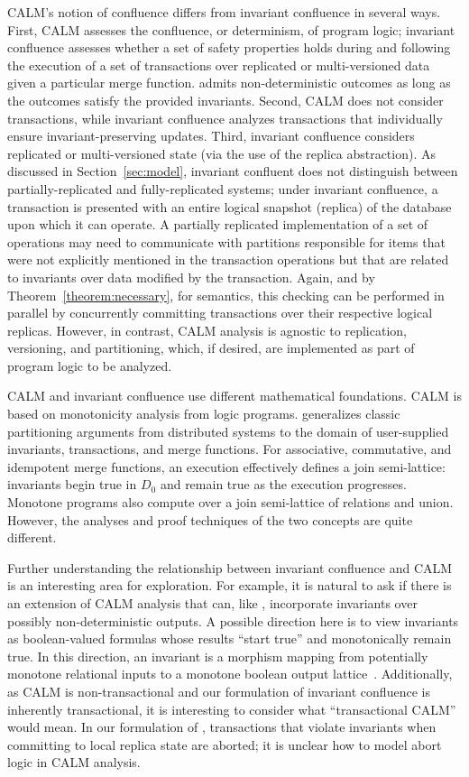 CALM's notion of confluence differs from invariant confluence in
several ways. First, CALM assesses the confluence, or determinism, of
program logic; invariant confluence assesses whether a set of safety
properties holds during and following the execution of a set of
transactions over replicated or multi-versioned data given a
particular merge function. \Iconfluence admits non-deterministic
outcomes as long as the outcomes satisfy the provided invariants.
Second, CALM does not consider transactions, while invariant
confluence analyzes transactions that individually ensure
invariant-preserving updates.  Third, invariant confluence considers
replicated or multi-versioned state (via the use of the replica
abstraction). As discussed in Section~\ref{sec:model}, invariant
confluent does not distinguish between partially-replicated and
fully-replicated systems; under invariant confluence, a transaction is
presented with an entire logical snapshot (replica) of the database
upon which it can operate. A partially replicated implementation of a
set of \iconfluent operations may need to communicate with partitions
responsible for items that were not explicitly mentioned in the
transaction operations but that are related to invariants over data
modified by the transaction. Again, and by
Theorem~\ref{theorem:necessary}, for \iconfluent semantics, this
checking can be performed in parallel by concurrently committing
transactions over their respective logical replicas. However, in
contrast, CALM analysis is agnostic to replication, versioning, and
partitioning, which, if desired, are implemented as part of program
logic to be analyzed.

CALM and invariant confluence use different mathematical
foundations. CALM is based on monotonicity analysis from logic
programs. \Iconfluence generalizes classic partitioning arguments from
distributed systems to the domain of user-supplied invariants,
transactions, and merge functions. For associative, commutative, and
idempotent merge functions, an \iconfluent execution effectively
defines a join semi-lattice: invariants begin true in $D_0$ and remain
true as the execution progresses. Monotone programs also compute over
a join semi-lattice of relations and union. However, the analyses and
proof techniques of the two concepts are quite different.

Further understanding the relationship between invariant confluence
and CALM is an interesting area for exploration. For example, it is
natural to ask if there is an extension of CALM analysis that can,
like \iconfluence, incorporate invariants over possibly
non-deterministic outputs. A possible direction here is to view
invariants as boolean-valued formulas whose results ``start true'' and
monotonically remain true. In this direction, an invariant is a
morphism mapping from potentially monotone relational inputs to a
monotone boolean output lattice~\cite{blooml}.  Additionally, as CALM
is non-transactional and our formulation of invariant confluence is
inherently transactional, it is interesting to consider what
``transactional CALM'' would mean. In our formulation of \iconfluence,
transactions that violate invariants when committing to local replica
state are aborted; it is unclear how to model abort logic in CALM
analysis.


